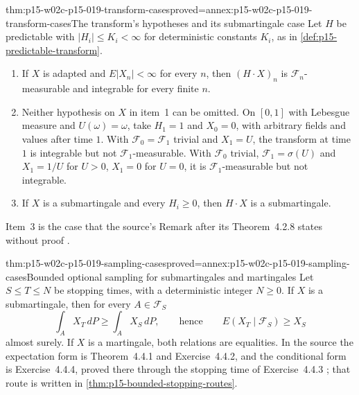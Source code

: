 \begin{hbtheorem}{thm:p15-w02c-p15-019-transform-cases}{proved=annex:p15-w02c-p15-019-transform-cases}{The transform's hypotheses and its submartingale case}
Let \(H\) be predictable with \(|H_i|\leq K_i<\infty\) for deterministic
constants \(K_i\), as in \cref{def:p15-predictable-transform}.
\begin{enumerate}
\item If \(X\) is adapted and \(E|X_n|<\infty\) for every \(n\), then
      \((H\cdot X)_n\) is \(\mathcal F_n\)-measurable and integrable for
      every finite \(n\).
\item Neither hypothesis on \(X\) in item~1 can be omitted. On
      \([0,1]\) with Lebesgue measure and \(U(\omega)=\omega\), take
      \(H_1=1\) and \(X_0=0\), with arbitrary fields and values after
      time \(1\). With \(\mathcal F_0=\mathcal F_1\) trivial
      and \(X_1=U\), the transform at time \(1\) is integrable but not
      \(\mathcal F_1\)-measurable. With \(\mathcal F_0\) trivial,
      \(\mathcal F_1=\sigma(U)\) and \(X_1=1/U\) for \(U>0\),
      \(X_1=0\) for \(U=0\), it is \(\mathcal F_1\)-measurable but not
      integrable.
\item If \(X\) is a submartingale and every \(H_i\geq0\), then
      \(H\cdot X\) is a submartingale.
\end{enumerate}
Item~3 is the case that the source's Remark after its Theorem~4.2.8
states without proof \cite[thm.~4.2.8 and remark, p.~220]{DurrettPTEAuthor2019}.
\end{hbtheorem}

\begin{hbtheorem}{thm:p15-w02c-p15-019-sampling-cases}{proved=annex:p15-w02c-p15-019-sampling-cases}{Bounded optional sampling for submartingales and martingales}
Let \(S\leq T\leq N\) be stopping times, with a deterministic integer
\(N\geq0\). If \(X\) is a submartingale, then for every
\(A\in\mathcal F_S\)
\[
               \int_AX_T\,dP\geq\int_AX_S\,dP,
               \qquad\text{hence}\qquad
               E(X_T\mid\mathcal F_S)\geq X_S
\]
almost surely. If \(X\) is a martingale, both relations are equalities.
In the source the expectation form is Theorem~4.4.1 and
Exercise~4.4.2, and the conditional form is Exercise~4.4.4, proved
there through the stopping time of Exercise~4.4.3
\cite[thm.~4.4.1, p.~235; exs.~4.4.2--4.4.4, pp.~238--239]{DurrettPTEAuthor2019};
that route is written in \cref{thm:p15-bounded-stopping-routes}.
\end{hbtheorem}

